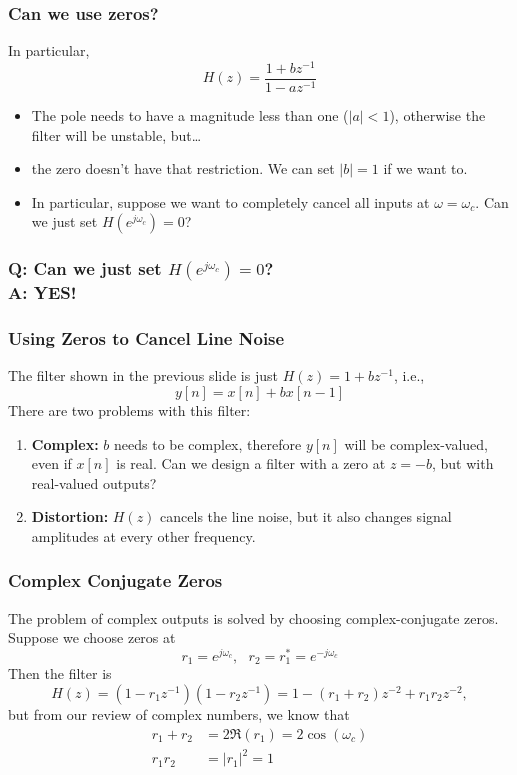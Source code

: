 \documentclass{beamer}
\begin{document}
\begin{frame}
  \frametitle{Can we use zeros?}

  In particular,
  \[
  H(z)  = \frac{1+bz^{-1}}{1-az^{-1}}
  \]
  \begin{itemize}
  \item The pole needs to have a magnitude less than one ($|a|<1$),
    otherwise the filter will be unstable, but\ldots
  \item the zero doesn't have that restriction.  We can set $|b|=1$ if we want to.
  \item In particular, suppose we want to completely cancel all inputs
    at $\omega=\omega_c$.  Can we just set $H(e^{j\omega_c})=0$?
  \end{itemize}
\end{frame}

\begin{frame}
  \frametitle{{\bf Q}: Can we just set $H(e^{j\omega_c})=0$?\\{\bf A: YES!}}
  \centerline{}
\end{frame}  

\begin{frame}
  \frametitle{Using Zeros to Cancel Line Noise}
  The filter shown in the previous slide is just $H(z)=1+bz^{-1}$, i.e.,
  \begin{displaymath}
    y[n] = x[n] + bx[n-1]
  \end{displaymath}
  There are two problems with this filter:
  \begin{enumerate}
  \item {\bf Complex:} $b$ needs to be complex, therefore $y[n]$ will
    be complex-valued, even if $x[n]$ is real.  Can we design a filter
    with a zero at $z=-b$, but with real-valued outputs?
  \item {\bf Distortion:} $H(z)$ cancels the line noise, but it also
    changes signal amplitudes at every other frequency.
  \end{enumerate}
\end{frame}

\begin{frame}
  \frametitle{Complex Conjugate Zeros}

  The problem of complex outputs is solved by choosing
  complex-conjugate zeros.  Suppose we choose zeros at
  \begin{displaymath}
    r_1 = e^{j\omega_c},~~~r_2=r_1^*=e^{-j\omega_c}
  \end{displaymath}
  Then the filter is
  \begin{displaymath}
    H(z) = (1-r_1z^{-1})(1-r_2z^{-1}) = 1-(r_1+r_2)z^{-2} + r_1r_2z^{-2},
  \end{displaymath}
  but from our review of complex numbers, we know that
  \begin{align*}
    r_1+r_2 &= 2\Re(r_1) = 2\cos(\omega_c)\\
    r_1r_2 &= |r_1|^2 = 1
  \end{align*}
\end{frame}
\end{document}
